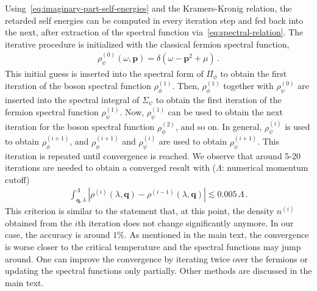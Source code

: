 Using~\eqref{eq:imaginary-part-self-energies} and the Kramers-Kronig relation, the retarded self energies can be computed in every iteration step and fed back into the next, after extraction of the spectral function via~\eqref{eq:spectral-relation}. The iterative procedure is initialized with the classical fermion spectral function,
%
\begin{align} \label{eq:inital-fermion-spec}
\rho^{(0)}_{\psi}(\omega,\bm{p}) = \delta(\omega-\bm{p}^2+\mu) \,.
\end{align}
%
This initial guess is inserted into the spectral form of $\Pi_{\phi}$ to obtain the first iteration of the boson spectral function $\rho_{\phi}^{(1)}$. Then, $\rho_{\phi}^{(1)}$ together with $\rho^{(0)}_{\psi}$ are inserted into the spectral integral of $\Sigma_{\psi}$ to obtain the first iteration of the fermion spectral function $\rho_{\psi}^{(1)}$. Now, $\rho_{\psi}^{(1)}$ can be used to obtain the next iteration for the boson spectral function $\rho_{\phi}^{(2)}$, and so on. In general, $\rho_{\psi}^{(i)}$ is used to obtain $\rho_{\phi}^{(i+1)}$, and $\rho_{\phi}^{(i+1)}$ and $\rho_{\psi}^{(i)}$ are used to obtain $\rho_{\psi}^{(i+1)}$. This iteration is repeated until convergence is reached. We observe that around 5-20 iterations are needed to obtain a converged result with ($\Lambda$: numerical momentum cutoff)
%
\begin{align}
\int_{\bm{q},\lambda}^{\Lambda} \left| \rho^{(i)}(\lambda,\bm{q})-\rho^{(i-1)}(\lambda,\bm{q}) \right| \lesssim 0.005\, \Lambda \,.
\end{align}
%
This criterion is similar to the statement that, at this point, the density $n^{(i)}$ obtained from the $i$th iteration does not change significantly anymore. In our case, the accuracy is around $1\%$.
As mentioned in the main text, the convergence is worse closer to the critical temperature and the spectral functions may jump around. One can improve the convergence by iterating twice over the fermions or updating the spectral functions only partially. Other methods are discussed in the main text.